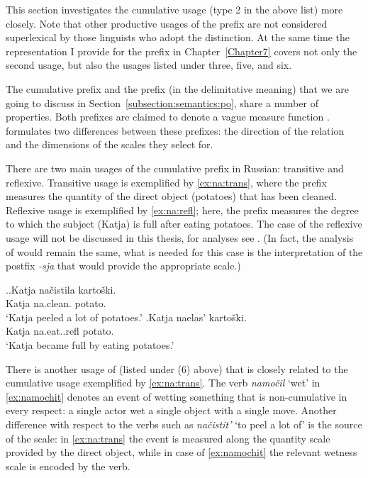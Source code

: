 This section investigates the cumulative usage (type 2 in the above list) more closely. Note that other productive usages of the prefix  are not considered superlexical by those linguists who adopt the distinction. At the same time the representation I provide for the prefix  in Chapter~\ref{Chapter7} covers not only the second usage, but also the usages listed under three, five, and six.

The cumulative prefix  and the prefix  (in the delimitative meaning) that we are going to discuss in Section~\ref{subsection:semantics:po}, share a number of properties. Both prefixes are claimed to denote a vague measure function \citep{Filip:00, Souchkova:04}. \citet{Souchkova:04} formulates two differences between these prefixes: the direction of the relation and the dimensions of the scales they select for.

There are two main usages of the cumulative prefix  in Russian: transitive and reflexive. Transitive usage is exemplified by \ref{ex:na:trans}, where the prefix measures the quantity of the direct object (potatoes) that has been cleaned. Reflexive usage is exemplified by \ref{ex:na:refl}; here, the prefix  measures the degree to which the subject (Katja) is full after eating potatoes. The case of the reflexive usage will not be discussed in this thesis, for analyses see \citet{KaganPereltsvaig:11a,KaganPereltsvaig:11b,Souchkova:04,Filip:00,Filip:05}. (In fact, the analysis of  would remain the same, what is needed for this case is the interpretation of the postfix \textit{-sja} that would provide the appropriate scale.)

\ex.\ag.\label{ex:na:trans}Katja na\v{c}istila karto\v{s}ki.\\
Katja na.clean. potato.\\
\trans `Katja peeled a lot of potatoes.'
\bg.\label{ex:na:refl}Katja naelas' karto\v{s}ki.\\
Katja na.eat..refl potato.\\
\trans `Katja became full by eating potatoes.'

There is another usage of  (listed under (6) above) that is closely related to the cumulative usage exemplified by \ref{ex:na:trans}. The verb \textit{namo\v{c}il} `wet' in \ref{ex:namochit} denotes an event of wetting something that is non-cumulative in every respect: a single actor wet a single object with a single move. Another difference with respect to the verbs such as \textit{na\v{c}istit'} `to peel a lot of' is the source of the scale: in \ref{ex:na:trans} the event is measured along the quantity scale provided by the direct object, while in case of \ref{ex:namochit} the relevant wetness scale is encoded by the verb.

